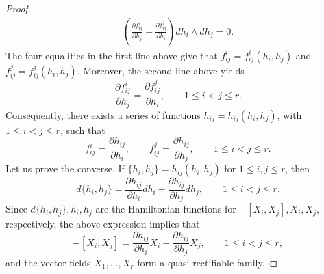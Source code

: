 \documentclass[10pt,a4paper]{amsart}
\begin{document}
\begin{proof}
$$\begin{gathered}
\left(\frac{\partial f_{ij}^i}{\partial h_j}-\frac{\partial f_{ij}^j}{\partial h_i}\right)dh_i\wedge dh_j=0.
\end{gathered}
$$
The four equalities in the first line above give that $f_{ij}^i=f_{ij}^i(h_i,h_j)$ and $f_{ij}^j=f_{ij}^j(h_i,h_j)$. Moreover, the second line above yields
$$
\frac{\partial f_{ij}^i}{\partial h_j}=\frac{\partial f_{ij}^j}{\partial h_i},\qquad 1\leq i<j\leq r.
$$
Consequently, there exists a series of functions $h_{ij}=h_{ij}(h_i,h_j)$, with $1\leq i<j\leq r$, such that
$$
f_{ij}^i=\frac{\partial h_{ij}}{\partial h_i},\qquad f_{ij}^j=\frac{\partial h_{ij}}{\partial h_j},\qquad 1\leq i<j\leq r.
$$
Let us prove the converse. If $\{h_i,h_j\}=h_{ij}(h_i,h_j)$ for $1\leq i,j\leq r$, then
$$
d\{h_i,h_j\}=\frac{\partial h_{ij}}{\partial h_i}dh_{i}+\frac{\partial h_{ij}}{\partial h_j}dh_{j},\qquad 1\leq i<j\leq r.
$$
Since $d\{h_i,h_j\},h_i,h_j$ are the Hamiltonian functions for $-[X_i,X_j],X_i,X_j$, respectively, the above expression implies that
$$
-[X_i,X_j]=\frac{\partial h_{ij}}{\partial h_i}X_{i}+\frac{\partial h_{ij}}{\partial h_j}X_{j},\qquad 1\leq i<j\leq r,
$$
and the vector fields $X_1,\ldots,X_r$ form a quasi-rectifiable family.

\end{proof}
\end{document}

